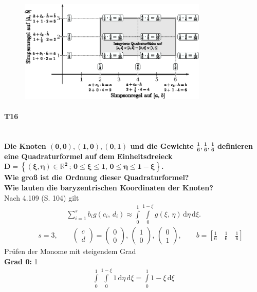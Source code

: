 \documentclass[10pt,a4paper]{article}
\begin{document}
	\begin{figure}[htbp]
		\centering
		\includegraphics[width=0.8\textwidth]{T15.eps}
	\end{figure}
	\newpage
	\paragraph{T16}\mbox{}\\
	\textbf{%
	Die Knoten $\mathbf{(0,0), (1,0), (0,1)}$ und die Gewichte $\mathbf{\frac{1}{6},\frac{1}{6},\frac{1}{6}}$ definieren eine Quadraturformel auf dem Einheitsdreieck $\mathbf{D=\left\lbrace (\xi,\eta) \in \mathbb{R}^2 \,;\, 0\leq\xi\leq 1,\, 0\leq\eta \leq1-\xi \right\rbrace}$.\\
	Wie groß ist die Ordnung dieser Quadraturformel? \\
	Wie lauten die baryzentrischen Koordinaten der Knoten?
	} \\
	Nach 4.109 (S. 104) gilt
	\begin{align*}
		\sum_{i=1}^{s}b_ig(c_i,\,d_i)\approx\int\limits_{0}^{1}\int\limits_{0}^{1-\xi}g(\xi,\,\eta)\,\text{d}\eta\,\text{d}\xi.
	\end{align*}
	\begin{align*}
		\qquad s=3, \qquad \begin{pmatrix}c \\ d\end{pmatrix} 
		= \begin{pmatrix}0 \\ 0\end{pmatrix},\, 
		\begin{pmatrix}1 \\ 0\end{pmatrix}
		,\, \begin{pmatrix}0 \\ 1\end{pmatrix} , \qquad b=\left[ \frac{1}{6}\quad \frac{1}{6}\quad \frac{1}{6}\right] 
	\end{align*}
	Prüfen der Monome mit steigendem Grad \\
	\textbf{Grad 0:} 1
	\begin{align*}
		\int\limits_{0}^{1}\int\limits_{0}^{1-\xi}1\,\text{d}\eta\,\text{d}\xi =
		\int\limits_{0}^{1}1-\xi\,\text{d}\xi
	\end{align*}
	
\end{document}

